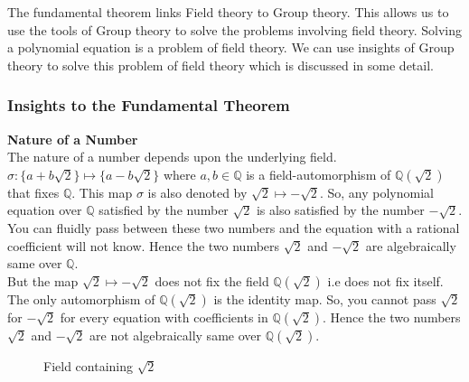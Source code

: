 \documentclass[11pt]{amsart}
\theoremstyle{plain}
\theoremstyle{definition}
\numberwithin{equation}{section}
\begin{document}
The fundamental theorem links Field theory to Group theory. This allows us to use the tools of Group theory to solve the problems involving field theory. Solving a polynomial equation is a problem of field theory. We can use insights of Group theory to solve this problem of field theory which is discussed in some detail.

\subsubsection{Insights to the Fundamental Theorem}

\textbf{Nature of a Number}\\
The nature of a number depends upon the underlying field. \(\sigma:\{a+b\sqrt{2}\} \mapsto \{a-b\sqrt{2}\}\) where \(a,b \in \mathbb{Q}\) is a field-automorphism of  \(\mathbb{Q}(\sqrt{2})\) that fixes \(\mathbb{Q}\). This map \(\sigma \) is also denoted by \(\sqrt{2} \longmapsto -\sqrt{2}\). So, any polynomial equation over \(\mathbb{Q}\) satisfied by the number \(\sqrt{2}\) is also satisfied by the number \(-\sqrt{2}\). You can fluidly pass between these two numbers and the equation with a rational coefficient will not know. Hence the two numbers \(\sqrt{2}\) and \(-\sqrt{2}\) are algebraically same over \(\mathbb{Q}\).\\

But the map \(\sqrt{2} \longmapsto -\sqrt{2}\) does not fix the field \(\mathbb{Q}(\sqrt{2})\) i.e does not fix itself. The only automorphism of \(\mathbb{Q}(\sqrt{2})\) is the identity map. So, you cannot pass \(\sqrt{2}\) for \(-\sqrt{2}\) for every equation with coefficients in \(\mathbb{Q}(\sqrt{2})\). Hence the two numbers \(\sqrt{2}\) and \(-\sqrt{2}\) are not algebraically same over \(\mathbb{Q}(\sqrt{2})\).

\begin{figure}[h]
  \centering
  \small
    \caption{\footnotesize Field containing \(\sqrt{2}\)}
    \end{figure}
\end{document}
